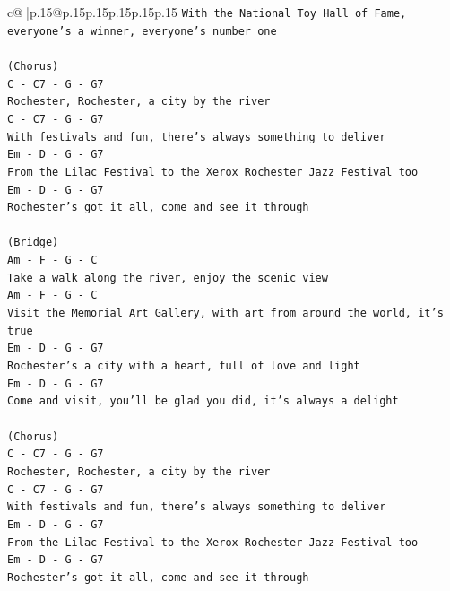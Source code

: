 \documentclass{article}
\begin{document}
{\begin{supertabular}{c@{$\;$}|p{.15\linewidth}@{}p{.15\linewidth}p{.15\linewidth}p{.15\linewidth}p{.15\linewidth}p{.15\linewidth}}
{{{\texttt{With the National Toy Hall of Fame, everyone's a winner, everyone's number one} \\
\\ 
\texttt{(Chorus)} \\
\texttt{C {-} C7 {-} G {-} G7} \\
\texttt{Rochester, Rochester, a city by the river} \\
\texttt{C {-} C7 {-} G {-} G7} \\
\texttt{With festivals and fun, there's always something to deliver} \\
\texttt{Em {-} D {-} G {-} G7} \\
\texttt{From the Lilac Festival to the Xerox Rochester Jazz Festival too} \\
\texttt{Em {-} D {-} G {-} G7} \\
\texttt{Rochester's got it all, come and see it through} \\
\\ 
\texttt{(Bridge)} \\
\texttt{Am {-} F {-} G {-} C} \\
\texttt{Take a walk along the river, enjoy the scenic view} \\
\texttt{Am {-} F {-} G {-} C} \\
\texttt{Visit the Memorial Art Gallery, with art from around the world, it's true} \\
\texttt{Em {-} D {-} G {-} G7} \\
\texttt{Rochester's a city with a heart, full of love and light} \\
\texttt{Em {-} D {-} G {-} G7} \\
\texttt{Come and visit, you'll be glad you did, it's always a delight} \\
\\ 
\texttt{(Chorus)} \\
\texttt{C {-} C7 {-} G {-} G7} \\
\texttt{Rochester, Rochester, a city by the river} \\
\texttt{C {-} C7 {-} G {-} G7} \\
\texttt{With festivals and fun, there's always something to deliver} \\
\texttt{Em {-} D {-} G {-} G7} \\
\texttt{From the Lilac Festival to the Xerox Rochester Jazz Festival too} \\
\texttt{Em {-} D {-} G {-} G7} \\
\texttt{Rochester's got it all, come and see it through} \\
}}}
\end{supertabular}}
\end{document}
